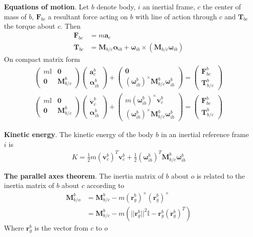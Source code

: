 \textbf{Equations of motion}. Let \(b\) denote body, \(i\) an inertial frame, \(c\) the center of mass of \(b\), \(\bm{F}_{bc}\) a resultant force acting on \(b\) with line of action through \(c\) and \(\bm{T}_{bc}\) the torque about \(c\). Then
\begin{align*}
    \bm{F}_{bc} &= m\bm{a}_c \\
    \bm{T}_{bc} &= \bm{M}_{b/c}\bm{\alpha}_{ib} + \bm{\omega}_{ib}\times(\bm{M}_{b/c}\bm{\omega}_{ib})
\end{align*}
On compact matrix form
\begin{align*}
    \begin{pmatrix} m\mathbb{I} & \bm{0} \\ \bm{0} & \bm{M}_{b/c}^b \end{pmatrix}
        \begin{pmatrix}\bm{a}_c^b \\ \bm{\alpha}_{ib}^b \end{pmatrix} + 
        \begin{pmatrix} \bm{0} \\ (\bm{\omega}_{ib}^b)^\times\bm{M}_{b/c}^b\bm{\omega}_{ib}^b\end{pmatrix} =
            \begin{pmatrix}\bm{F}_{bc}^b \\ \bm{T}_{b/c}^b\end{pmatrix} \\
    \begin{pmatrix} m\mathbb{I} & \bm{0} \\ \bm{0} & \bm{M}_{b/c}^b \end{pmatrix}
        \begin{pmatrix}\dot{\bm{v}}_c^b \\ \bm{\alpha}_{ib}^b \end{pmatrix} + 
            \begin{pmatrix} m(\bm{\omega}_{ib}^b)^\times\bm{v}_c^b \\ (\bm{\omega}_{ib}^b)^\times\bm{M}_{b/c}^b\bm{\omega}_{ib}^b\end{pmatrix} =
            \begin{pmatrix}\bm{F}_{bc}^b \\ \bm{T}_{b/c}^b\end{pmatrix}
\end{align*}

\textbf{Kinetic energy}. The kinetic energy of the body \(b\) in an inertial reference frame \(i\) is
\begin{align*}
    K = \frac{1}{2}m(\bm{v}_c^b)^T\bm{v}_c^b + \frac{1}{2}(\bm{\omega}_{ib}^b)^T\bm{M}_{b/c}^b\bm{\omega}_{ib}^b
\end{align*}

\textbf{The parallel axes theorem}. The inertia matrix of \(b\) about \(o\) is related to the inertia matrix of \(b\) about \(c\) according to
\begin{align*}
    \bm{M}_{b/o}^b &= \bm{M}_{b/c}^b-m(\bm{r}_g^b)^\times(\bm{r}_g^b)^\times \\
    &= \bm{M}_{b/c}^b-m(||\bm{r}_g^b||^2\mathbb{I}-\bm{r}_g^b(\bm{r}_g^b)^T)
\end{align*}
Where \(\bm{r}_g^b\) is the vector from \(c\) to \(o\)
